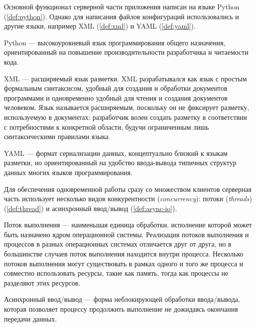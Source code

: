\noindent Основной функционал серверной части приложения написан на языке Python (\ref{def:python}). Однако для написания
файлов конфигураций использовались и другие языки, например XML (\ref{def:xml}) и YAML (\ref{def:yaml}).

\begin{definition}
    \label{def:python}
    Python — высокоуровневый язык программирования общего назначения, ориентированный на повышение производительности
    разработчика и читаемости кода.
\end{definition}

\begin{definition}
    \label{def:xml}
    XML — расширяемый язык разметки. XML разрабатывался как язык с простым формальным синтаксисом, удобный для создания
    и обработки документов программами и одновременно удобный для чтения и создания документов человеком.
    Язык называется расширяемым, поскольку он не фиксирует разметку, используемую в документах:
    разработчик волен создать разметку в соответствии с потребностями к конкретной области, будучи ограниченным лишь
    синтаксическими правилами языка.
\end{definition}

\begin{definition}
    \label{def:yaml}
    YAML — формат сериализации данных, концептуально близкий к языкам разметки, но ориентированный на удобство
    ввода-вывода типичных структур данных многих языков программирования.
\end{definition}

\noindent Для обеспечения одновременной работы сразу со множеством клиентов серверная часть использует несколько видов
конкурентности (\textit{concurrency}): потоки (\textit{threads}) (\ref{def:thread}) и асинхронный ввод/вывод
(\ref{def:async-io}).

\begin{definition}
    \label{def:thread}
    Поток выполнения — наименьшая единица обработки, исполнение которой может быть назначено ядром операционной системы.
    Реализация потоков выполнения и процессов в разных операционных системах отличается друг от друга, но в большинстве
    случаев поток выполнения находится внутри процесса. Несколько потоков выполнения могут существовать в рамках одного
    и того же процесса и совместно использовать ресурсы, такие как память, тогда как процессы не разделяют этих ресурсов.
\end{definition}

\begin{definition}
    \label{def:async-io}
    Асинхронный ввод/вывод — форма неблокирующей обработки ввода/вывода, которая позволяет процессу
    продолжить выполнение не дожидаясь окончания передачи данных.
\end{definition}

